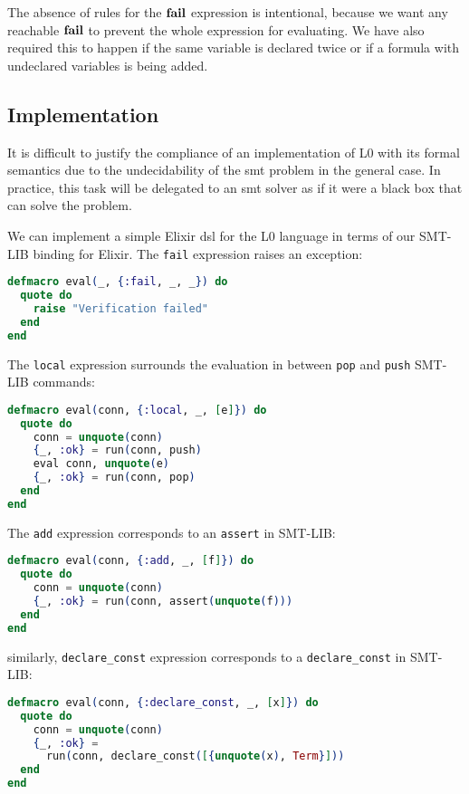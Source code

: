 \bigskip

The absence of rules for the $\textbf{fail}$ expression is intentional, because we
want any reachable $\textbf{fail}$ to prevent the whole expression for evaluating.
We have also required this to happen if the same variable is declared twice
or if a formula with undeclared variables is being added.

\subsection{Implementation}

It is difficult to justify the compliance of an implementation of L0 with its
formal semantics due to the undecidability of the \gls{smt} problem in the 
general case. In practice, this task will be delegated to an \acrshort{smt} 
solver as if it were a black box that can solve the problem.

We can implement a simple Elixir \gls{dsl} for the L0 language in terms of our
SMT-LIB binding for Elixir. The \verb|fail| expression raises an exception:

\begin{lstlisting}[language=elixir,numbers=none,frame=none]
defmacro eval(_, {:fail, _, _}) do
  quote do
    raise "Verification failed"
  end
end
\end{lstlisting}

The \verb|local| expression surrounds the evaluation in between
\verb|pop| and \verb|push| SMT-LIB commands:

\begin{lstlisting}[language=elixir,numbers=none,frame=none]
defmacro eval(conn, {:local, _, [e]}) do
  quote do
    conn = unquote(conn)
    {_, :ok} = run(conn, push)
    eval conn, unquote(e)
    {_, :ok} = run(conn, pop)
  end
end
\end{lstlisting}

The \verb|add| expression corresponds to an \verb|assert| in 
SMT-LIB:

\begin{lstlisting}[language=elixir,numbers=none,frame=none]
defmacro eval(conn, {:add, _, [f]}) do
  quote do
    conn = unquote(conn)
    {_, :ok} = run(conn, assert(unquote(f)))
  end
end
\end{lstlisting}

similarly, \verb|declare_const| expression corresponds to a \verb|declare_const| in 
SMT-LIB:

\begin{lstlisting}[language=elixir,numbers=none,frame=none]
defmacro eval(conn, {:declare_const, _, [x]}) do
  quote do
    conn = unquote(conn)
    {_, :ok} = 
      run(conn, declare_const([{unquote(x), Term}]))
  end
end
\end{lstlisting}

